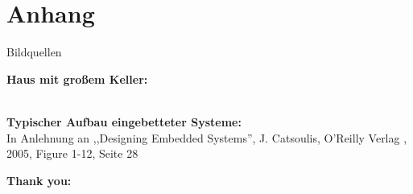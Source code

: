 \section{Anhang}
%

{
    \tiny
    \begin{frame}{Bildquellen}
        \begin{minipage}{\textwidth}
            \textbf{Haus mit großem Keller:} \\
             \\
        \end{minipage}
        \medskip

        \begin{minipage}{\textwidth}
            \textbf{Typischer Aufbau eingebetteter Systeme:} \\
            In Anlehnung an ,,Designing Embedded Systems'', J. Catsoulis, O'Reilly Verlag , 2005, Figure 1-12, Seite 28
        \end{minipage}
        \medskip

        \textbf{Thank you:} \\
    \end{frame}
}
